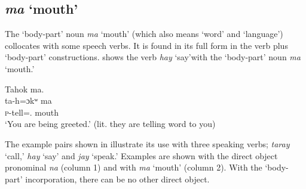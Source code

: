 \subsection{\textit{ma} ‘mouth’}\label{sec:9.3.3}\label{sec:9.3.1.3}

The ‘body-part’ noun \textit{ma} ‘mouth’ (which also means ‘word’ and ‘language’) collocates with some speech verbs. It is found in its full form in the verb plus ‘body-part’ constructions.  shows the verb \textit{hay} ‘say’with the ‘body-part’ noun \textit{ma} ‘mouth.’ 

\ea \label{ex:9:57}
Tahok  ma.\\
\gll  ta-h=ɔkʷ    ma\\
      \textsc{p}-tell={\twoS}.{\IO}    mouth\\
\glt  ‘You are being greeted.’ (lit. they are telling word to you) 
\z

The example pairs shown in  illustrate its use with three speaking verbs; \textit{taray} ‘call,’ \textit{hay} ‘say’ and \textit{jay} ‘speak.’ Examples are shown with the direct object pronominal \textit{na} (column 1) and with \textit{ma} ‘mouth’ (column 2). With the ‘body-part’ incorporation, there can be no other direct object. 

